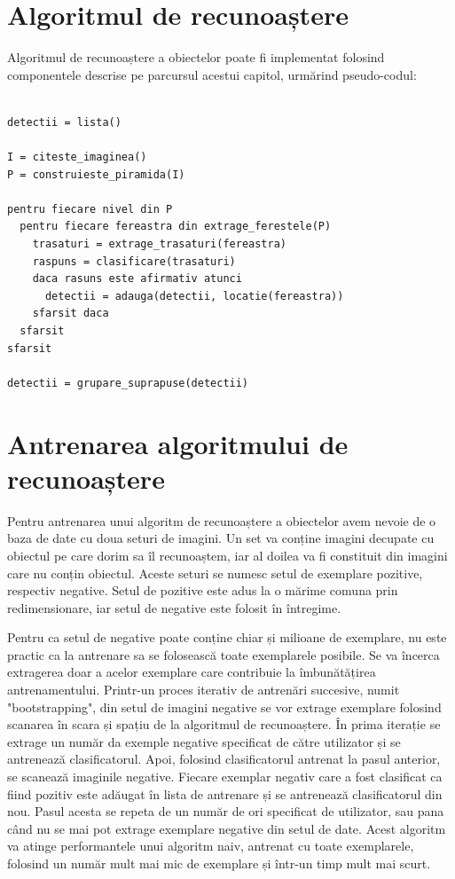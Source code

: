 \pagebreak
\section{Algoritmul de recunoaștere}

Algoritmul de recunoaștere a obiectelor poate fi implementat folosind componentele descrise pe parcursul acestui capitol, urmărind pseudo-codul:
\begin{mdframed}
\begin{verbatim}

detectii = lista()

I = citeste_imaginea()
P = construieste_piramida(I)

pentru fiecare nivel din P
  pentru fiecare fereastra din extrage_ferestele(P)
    trasaturi = extrage_trasaturi(fereastra)
    raspuns = clasificare(trasaturi)
    daca rasuns este afirmativ atunci
      detectii = adauga(detectii, locatie(fereastra))
    sfarsit daca
  sfarsit
sfarsit

detectii = grupare_suprapuse(detectii)

\end{verbatim}
\end{mdframed}

\section{Antrenarea algoritmului de recunoaștere}

Pentru antrenarea unui algoritm de recunoaștere a obiectelor avem nevoie de o baza de date cu doua seturi de imagini.
Un set va conține imagini decupate cu obiectul pe care dorim sa îl recunoaștem, iar al doilea va fi constituit din imagini care nu conțin obiectul.
Aceste seturi se numesc setul de exemplare pozitive, respectiv negative.
Setul de pozitive este adus la o mărime comuna prin redimensionare, iar setul de negative este folosit în întregime.

Pentru ca setul de negative poate conține chiar și milioane de exemplare, nu este practic ca la antrenare sa se folosească toate exemplarele posibile.
Se va încerca extragerea doar a acelor exemplare care contribuie la îmbunătățirea antrenamentului.
Printr-un proces iterativ de antrenări succesive, numit "bootstrapping", din setul de imagini negative se vor extrage exemplare folosind scanarea în scara și spațiu de la algoritmul de recunoaștere.
În prima iterație se extrage un număr da exemple negative specificat de către utilizator și se antrenează clasificatorul.
Apoi, folosind clasificatorul antrenat la pasul anterior, se scanează imaginile negative.
Fiecare exemplar negativ care a fost clasificat ca fiind pozitiv este adăugat în lista de antrenare și se antrenează clasificatorul din nou.
Pasul acesta se repeta de un număr de ori specificat de utilizator, sau pana când nu se mai pot extrage exemplare negative din setul de date.
Acest algoritm va atinge performantele unui algoritm naiv, antrenat cu toate exemplarele, folosind un număr mult mai mic de exemplare și într-un timp mult mai scurt.

